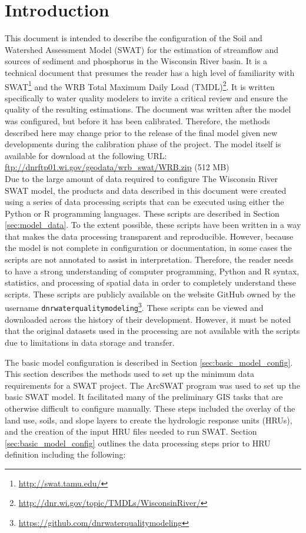\section{Introduction}
This document is intended to describe the configuration of the Soil and
Watershed Assessment Model (SWAT) \citep{arnold_swat_1994} for the estimation of streamflow and sources
of sediment and phosphorus in the Wisconsin River basin. It is a technical
document that presumes the reader has a high level of familiarity with SWAT\footnote{\url{http://swat.tamu.edu/}} and
the WRB Total Maximum Daily Load (TMDL)\footnote{\url{http://dnr.wi.gov/topic/TMDLs/WisconsinRiver/}}.
It is written specifically to water quality
modelers to invite a critical review and ensure the quality of the resulting
estimations. The document was written after the model was configured, but before
it has been calibrated. Therefore, the methods described here may change prior
to the release of the final model given new developments during the calibration
phase of the project. The model itself is available for download at the following URL: \\

\url{ftp://dnrftp01.wi.gov/geodata/wrb_swat/WRB.zip} (512 MB)\\

Due to the large amount of data required to configure The Wisconsin River SWAT model, the
products and data described in this document were created using a series of data 
processing scripts
that can be executed using either the Python or R programming languages. These scripts
are described in Section \ref{sec:model_data}. To the
extent possible, these scripts have been written in a way that makes
the data processing transparent and reproducible. However, because the model is
not complete in configuration or documentation, in some cases the scripts are not
annotated to assist in interpretation. Therefore, the reader needs to have a
strong understanding of computer programming, Python and R syntax, statistics,
and processing of spatial data in order to completely understand these scripts. These scripts are publicly available on the
website GitHub owned by the username
\texttt{dnrwaterqualitymodeling}\footnote{\url{https://github.com/dnrwaterqualitymodeling}}. 
These scripts can be viewed and downloaded
across the history of their development. However, it must be noted that the
original datasets used in the processing are not available with the scripts due
to limitations in data storage and transfer.

The basic model configuration is described in Section \ref{sec:basic_model_config}. 
This section describes the methods used to set up the minimum data requirements for a SWAT project. 
The ArcSWAT program was used to set up the basic SWAT model. It facilitated many of the preliminary GIS tasks that are otherwise difficult to configure manually.
These steps included the overlay of the land use, soils, and slope layers to create the hydrologic response units (HRUs), and the creation of the input HRU files needed to run SWAT. Section \ref{sec:basic_model_config} outlines the data processing steps prior to HRU definition including the following:

